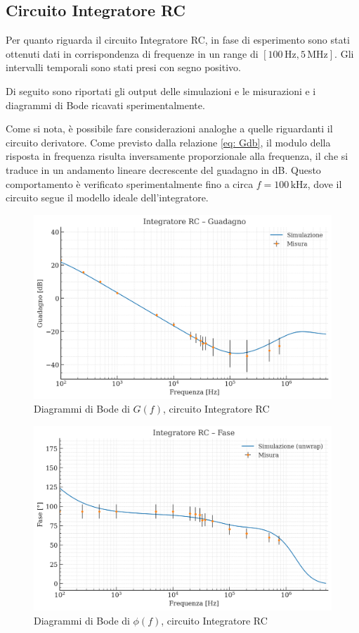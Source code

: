 \documentclass[a4paper,12pt]{article}
\begin{document}
\subsection{Circuito Integratore RC}
Per quanto riguarda il circuito Integratore RC, in fase di esperimento sono stati ottenuti dati in corrispondenza di frequenze in un range di $[100\,\mathrm{Hz}, 5\,\mathrm{MHz}]$. Gli intervalli temporali sono stati presi con segno positivo.

Di seguito sono riportati gli output delle simulazioni e le misurazioni e i diagrammi di Bode ricavati sperimentalmente.

Come si nota, è possibile fare considerazioni analoghe a quelle riguardanti il circuito derivatore. Come previsto dalla relazione \eqref{eq: Gdb}, il modulo della risposta in frequenza risulta inversamente proporzionale alla frequenza, il che si traduce in un andamento lineare decrescente del guadagno in dB. Questo comportamento è verificato sperimentalmente fino a circa \(f = 100\,\mathrm{kHz}\), dove il circuito segue il modello ideale dell'integratore.

\begin{figure}[H]
  \centering
  \includegraphics[width=.8\textwidth]{Integratore_guadagno.png}
  \caption{Diagrammi di Bode di $G(f)$, circuito Integratore RC}
\end{figure}

\begin{figure}[H]
  \centering
  \includegraphics[width=.8\textwidth]{Integratore_fase.png}
  \caption{Diagrammi di Bode di $\phi(f)$, circuito Integratore RC}
\end{figure}
\end{document}
